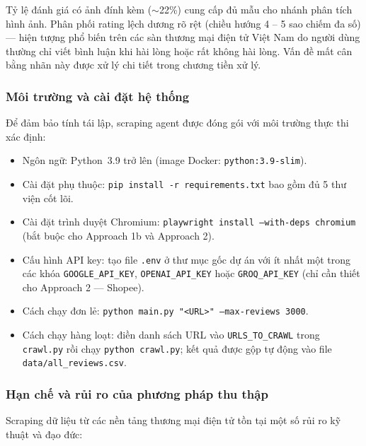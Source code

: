 Tỷ lệ đánh giá có ảnh đính kèm ($\sim$22\%) cung cấp đủ mẫu cho nhánh phân tích hình ảnh. Phân phối rating lệch dương rõ rệt (chiều hướng 4 -- 5 sao chiếm đa số) --- hiện tượng phổ biến trên các sàn thương mại điện tử Việt Nam do người dùng thường chỉ viết bình luận khi hài lòng hoặc rất không hài lòng. Vấn đề mất cân bằng nhãn này được xử lý chi tiết trong chương tiền xử lý.

\subsubsection{Môi trường và cài đặt hệ thống}

Để đảm bảo tính tái lập, scraping agent được đóng gói với môi trường thực thi xác định:

\begin{itemize}[labelsep=10pt, leftmargin=2cm]
    \item Ngôn ngữ: Python~3.9 trở lên (image Docker: \texttt{python:3.9-slim}).
    \item Cài đặt phụ thuộc: \texttt{pip install -r requirements.txt} bao gồm đủ 5 thư viện cốt lõi.
    \item Cài đặt trình duyệt Chromium: \texttt{playwright install --with-deps chromium} (bắt buộc cho Approach 1b và Approach 2).
    \item Cấu hình API key: tạo file \texttt{.env} ở thư mục gốc dự án với ít nhất một trong các khóa \texttt{GOOGLE\_API\_KEY}, \texttt{OPENAI\_API\_KEY} hoặc \texttt{GROQ\_API\_KEY} (chỉ cần thiết cho Approach 2 --- Shopee).
    \item Cách chạy đơn lẻ: \texttt{python main.py "<URL>" --max-reviews 3000}.
    \item Cách chạy hàng loạt: điền danh sách URL vào \texttt{URLS\_TO\_CRAWL} trong \texttt{crawl.py} rồi chạy \texttt{python crawl.py}; kết quả được gộp tự động vào file \texttt{data/all\_reviews.csv}.
\end{itemize}

\subsubsection{Hạn chế và rủi ro của phương pháp thu thập}

Scraping dữ liệu từ các nền tảng thương mại điện tử tồn tại một số rủi ro kỹ thuật và đạo đức:

